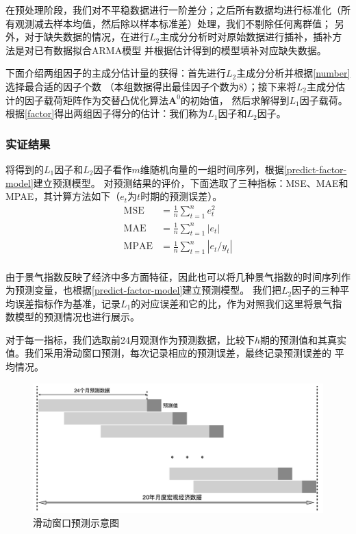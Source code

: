 在预处理阶段，我们对不平稳数据进行一阶差分；之后所有数据均进行标准化（所有观测减去样本均值，然后除以样本标准差）处理，我们不剔除任何离群值；
另外，对于缺失数据的情况，在进行$L_2$主成分分析时对原始数据进行插补，插补方法是对已有数据拟合ARMA模型
并根据估计得到的模型填补对应缺失数据。

下面介绍两组因子的主成分估计量的获得：首先进行$L_2$主成分分析并根据\eqref{number}选择最合适的因子个数
（本组数据得出最佳因子个数为8）；接下来将$L_2$主成分估计的因子载荷矩阵作为交替凸优化算法$\bm{A}^0$的初始值，
然后求解得到$L_1$因子载荷。根据\eqref{factor}得出两组因子得分的估计：我们称为$L_1$因子和$L_2$因子。

\subsubsection{实证结果}

将得到的$L_1$因子和$L_2$因子看作$m$维随机向量的一组时间序列，根据\eqref{predict-factor-model}建立预测模型。
对预测结果的评价，下面选取了三种指标：MSE、MAE和MPAE，其计算方法如下（$e_t$为$t$时期的预测误差）。
\begin{equation}
    \begin{array}{clr}
        \text{MSE} &= \frac{1}{n}\sum_{t=1}^n e_t^2 \\
        \text{MAE} &= \frac{1}{n}\sum_{t=1}^n |e_t| \\
        \text{MPAE} &= \frac{1}{n}\sum_{t=1}^n |e_t / y_t| \\
    \end{array}
\end{equation}

由于景气指数反映了经济中多方面特征，因此也可以将几种景气指数的时间序列作为预测变量，也根据\eqref{predict-factor-model}建立预测模型。
我们把$L_2$因子的三种平均误差指标作为基准，记录$L_1$的对应误差和它的比，作为对照我们这里将景气指数模型的预测情况也进行展示。

对于每一指标，我们选取前24月观测作为预测数据，比较下$h$期的预测值和其真实值。我们采用滑动窗口预测，每次记录相应的预测误差，最终记录预测误差的
平均情况。

\begin{figure}[H]
    \centering
    \includegraphics[width=15cm]{pics/chapter2/predict.png}
    \caption{\small 滑动窗口预测示意图}
    \label{desc}
\end{figure}

